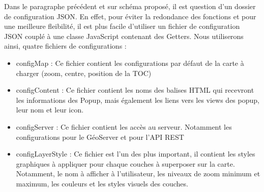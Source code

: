 Dans le paragraphe précédent et sur schéma proposé, il est question d'un dossier de configuration JSON. En effet, pour éviter la redondance des fonctions et pour une meilleure fleibilité, il est plus facile d'utiliser un fichier de configuration JSON couplé à une classe JavaScript contenant des Getters. Nous utiliserons ainsi, quatre fichiers de configurations :

\begin{itemize}
  \item configMap : Ce fichier contient les configurations par défaut de la carte à charger (zoom, centre, position de la TOC)
  \item configContent : Ce fichier contient les noms des balises HTML qui recevront les informations des Popup, mais également les liens vers les views des popup, leur nom et leur icon.
  \item configServer : Ce fichier contient les accès au serveur. Notamment les configurations pour le GéoServer et pour l'API REST
  \item configLayerStyle : Ce fichier est l'un des plus important, il contient les styles graphiques à appliquer pour chaque couches à superposer sur la carte. Notamment, le nom à afficher à l'utilisateur, les niveaux de zoom minimum et maximum, les couleurs et les styles visuels des couches.
\end{itemize}





